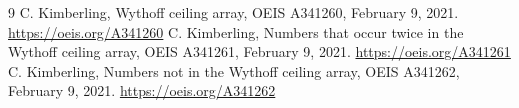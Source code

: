 \documentclass[11pt]{article}
\begin{document}
\begin{thebibliography}{9}
 C. Kimberling, Wythoff ceiling array, OEIS A341260,
February 9, 2021. \url{https://oeis.org/A341260}
 C. Kimberling, Numbers that occur twice in the Wythoff
ceiling array, OEIS A341261, February 9, 2021. \url{https://oeis.org/A341261}
 C. Kimberling, Numbers not in the Wythoff ceiling array,
OEIS A341262, February 9, 2021. \url{https://oeis.org/A341262}
\end{thebibliography}
\end{document}
